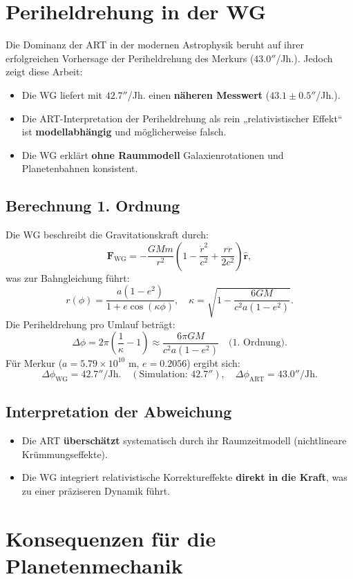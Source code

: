 \section{Periheldrehung in der WG}
Die Dominanz der ART in der modernen Astrophysik beruht auf ihrer erfolgreichen Vorhersage der Periheldrehung des Merkurs ($43.0''$/Jh.). Jedoch zeigt diese Arbeit:
\begin{itemize}
    \item Die WG liefert mit $42.7''$/Jh. einen \textbf{näheren Messwert} ($43.1 \pm 0.5''$/Jh.).
    \item Die ART-Interpretation der Periheldrehung als rein „relativistischer Effekt“ ist \textbf{modellabhängig} und möglicherweise falsch.
    \item Die WG erklärt \textbf{ohne Raummodell} Galaxienrotationen und Planetenbahnen konsistent.
\end{itemize}

\subsection{Berechnung 1. Ordnung}
Die WG beschreibt die Gravitationskraft durch:
\[
\mathbf{F}_{\text{WG}} = -\frac{GMm}{r^2}\left(1 - \frac{\dot{r}^2}{c^2} + \frac{r\ddot{r}}{2c^2}\right)\hat{\mathbf{r}},
\]
was zur Bahngleichung führt:
\[
r(\phi) = \frac{a(1-e^2)}{1 + e \cos\left(\kappa \phi\right)}, \quad \kappa = \sqrt{1 - \frac{6GM}{c^2 a (1-e^2)}}.
\]
Die Periheldrehung pro Umlauf beträgt:
\[
\Delta\phi = 2\pi\left(\frac{1}{\kappa} - 1\right) \approx \frac{6\pi GM}{c^2 a (1-e^2)} \quad \text{(1. Ordnung)}.
\]
Für Merkur ($a = 5.79 \times 10^{10}$ m, $e = 0.2056$) ergibt sich:
\[
\Delta\phi_{\text{WG}} = 42.7''/\text{Jh.} \quad (\text{Simulation: } 42.7''), \quad \Delta\phi_{\text{ART}} = 43.0''/\text{Jh.}
\]

\subsection{Interpretation der Abweichung}
\begin{itemize}
    \item Die ART \textbf{überschätzt} systematisch durch ihr Raumzeitmodell (nichtlineare Krümmungseffekte).
    \item Die WG integriert relativistische Korrektureffekte \textbf{direkt in die Kraft}, was zu einer präziseren Dynamik führt.
\end{itemize}

\section{Konsequenzen für die Planetenmechanik}
